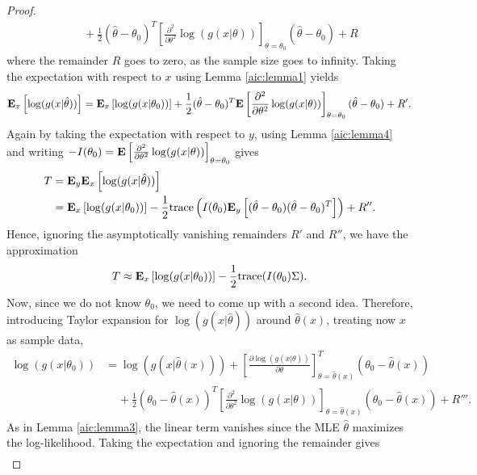 \documentclass[a4paper, 12pt]{scrreprt}
\newcommand{\trace}{{\mathrm{trace}}}
\newcommand{\ew}{\mbox{\textbf{E}}}
\begin{document}
\begin{proof}
\begin{align*}
 &\phantom{....} + \frac{1}{2}(\hat{\theta} - \theta_0)^T \left[ \frac{\partial^2}{\partial \theta^2} \log(g(x|\theta)) \right]_{\theta = \theta_0}  (\hat{\theta} - \theta_0) + R
\end{align*}
where the remainder $R$ goes to zero, as the sample size goes to infinity.
Taking the expectation with respect to $x$ using Lemma \ref{aic:lemma1} yields
\begin{align*}
\ew_x \left[\log(g(x|\hat{\theta})) \right]
= \ew_x \left[ \log(g(x|\theta_0)) \right] + \frac{1}{2}(\hat{\theta} - \theta_0)^T \ew \left[ \frac{\partial^2}{\partial \theta^2} \log(g(x|\theta)) \right]_{\theta = \theta_0}  (\hat{\theta} - \theta_0) + R'.
\end{align*}
Again by taking the expectation with respect to $y$, using Lemma \ref{aic:lemma4} and writing $-I(\theta_0) =  \ew \left[ \frac{\partial^2}{\partial \theta^2} \log(g(x|\theta)) \right]_{\theta= \theta_0}$ gives
\begin{align*}
T &= \ew_y \ew_x \left[\log(g(x|\hat{\theta})) \right] \\
& = \ew_x \left[ \log(g(x|\theta_0)) \right] - \frac{1}{2} \trace \left( I(\theta_0) \ew_y \left[(\hat{\theta} - \theta_0)(\hat{\theta} - \theta_0)^T \right] \right) + R''.
\end{align*}
Hence, ignoring the asymptotically vanishing remainders $R'$ and $R''$, we have the approximation
\begin{equation}\label{aic:eq}
T \approx \ew_x \left[ \log(g(x|\theta_0)) \right] - \frac{1}{2} \trace(I(\theta_0) \Sigma).
\end{equation}
Now, since we do not know $\theta_0$, we need to come up with a second idea. Therefore, introducing Taylor expansion for $\log(g(x|\hat{\theta}))$ around $\hat{\theta}(x)$, treating now $x$ as sample data,
\begin{align*}
\log(g(x|\theta_0)) 
&= \log(g(x|\hat{\theta}(x))) + \left[ \frac{\partial \log(g(x|\theta))}{\partial \theta} \right]_{\theta = \hat{\theta}(x)}^T (\theta_0 - \hat{\theta}(x)) \\
&\phantom{....} + \frac{1}{2}(\theta_0 - \hat{\theta}(x))^T \left[ \frac{\partial^2}{\partial \theta^2} \log(g(x|\theta)) \right]_{\theta= \hat{\theta}(x) }  (\theta_0 - \hat{\theta}(x)) + R'''.
\end{align*}
As in Lemma \ref{aic:lemma3}, the linear term vanishes since the MLE $\hat{\theta}$ maximizes the log-likelihood.
Taking the expectation and ignoring the remainder gives
\begin{align}

\end{align}
\end{proof}
\end{document}
